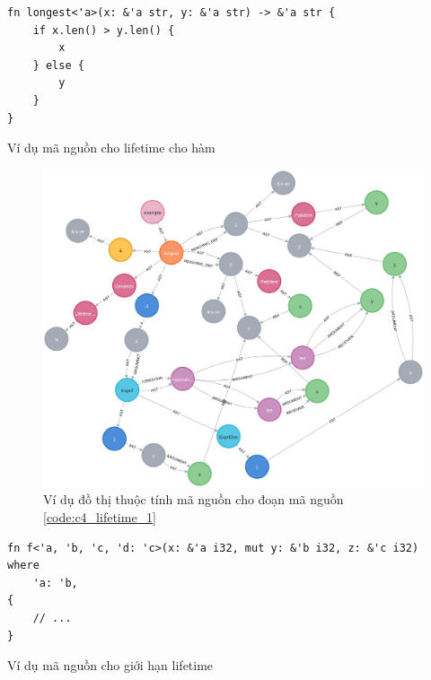 
\begin{listing}[H]
\begin{verbatim}
fn longest<'a>(x: &'a str, y: &'a str) -> &'a str {
    if x.len() > y.len() {
        x
    } else {
        y
    }
}
\end{verbatim}
\caption{Ví dụ mã nguồn cho lifetime cho hàm}
\label{code:c4_lifetime_1}
\end{listing}

\begin{figure}[H]
    \includegraphics[width=1\columnwidth]{figures/c4/c4_lifetime_1.png}
    \centering
    \caption{Ví dụ đồ thị thuộc tính mã nguồn cho đoạn mã nguồn \ref{code:c4_lifetime_1}}
    \label{img:c4_lifetime_1}
\end{figure}

\begin{listing}[H]
\begin{verbatim}
fn f<'a, 'b, 'c, 'd: 'c>(x: &'a i32, mut y: &'b i32, z: &'c i32)
where
    'a: 'b,
{
    // ...
}
\end{verbatim}
\caption{Ví dụ mã nguồn cho giới hạn lifetime}
\label{code:c4_lifetime_2}
\end{listing}

